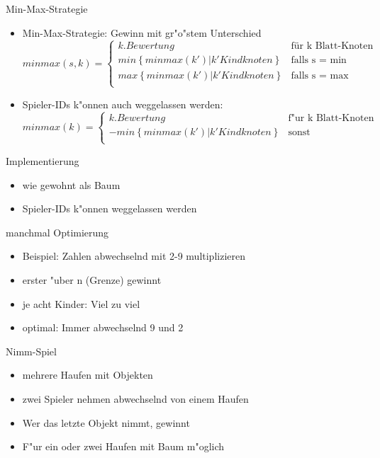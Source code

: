 \documentclass[18pt]{beamer}
\begin{document}
\begin{frame}{Min-Max-Strategie}
\begin{itemize}
\item Min-Max-Strategie: Gewinn mit gr"o"stem Unterschied
\begin{equation}
   minmax(s,k) =
   \begin{cases}
     k.Bewertung & \text{für k Blatt-Knoten} \\
     min\left\{minmax(k') | k' Kindknoten\right\} & \text{falls s = min} \\
     max\left\{minmax(k') | k' Kindknoten\right\} & \text{falls s = max} \\
   \end{cases}
\end{equation}
\pause
\item Spieler-IDs k"onnen auch weggelassen werden: 
\begin{equation}
   minmax(k) =
   \begin{cases}
     k.Bewertung & \text{f"ur k Blatt-Knoten} \\
     - min\left\{minmax(k') | k' Kindknoten\right\} & \text{sonst} \\
   \end{cases}
\end{equation}
\end{itemize}
\end{frame}

\begin{frame}{Implementierung}
\begin{itemize}
\item wie gewohnt als Baum

\item Spieler-IDs k"onnen weggelassen werden

\end{itemize}
\end{frame}

\begin{frame}{manchmal Optimierung}
\begin{itemize}
\item Beispiel: Zahlen abwechselnd mit 2-9 multiplizieren
\item erster "uber n (Grenze) gewinnt
\item je acht Kinder: Viel zu viel
\item optimal: Immer abwechselnd 9 und 2
\end{itemize}
\end{frame}

\begin{frame}{Nimm-Spiel}
\begin{itemize}
\item mehrere Haufen mit Objekten
\item zwei Spieler nehmen abwechselnd von einem Haufen
\item Wer das letzte Objekt nimmt, gewinnt
\item F"ur ein oder zwei Haufen mit Baum m"oglich 
\end{itemize}
\end{frame}
\end{document}

